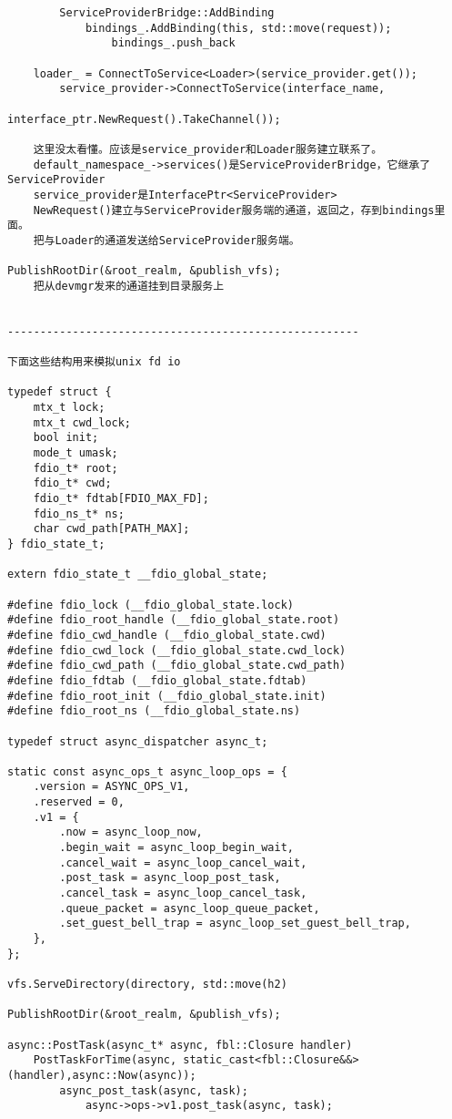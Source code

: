 \begin{verbatim}
        ServiceProviderBridge::AddBinding
            bindings_.AddBinding(this, std::move(request));
                bindings_.push_back

    loader_ = ConnectToService<Loader>(service_provider.get());
        service_provider->ConnectToService(interface_name,
                               interface_ptr.NewRequest().TakeChannel());

    这里没太看懂。应该是service_provider和Loader服务建立联系了。
    default_namespace_->services()是ServiceProviderBridge，它继承了ServiceProvider
    service_provider是InterfacePtr<ServiceProvider>
    NewRequest()建立与ServiceProvider服务端的通道，返回之，存到bindings里面。
    把与Loader的通道发送给ServiceProvider服务端。

PublishRootDir(&root_realm, &publish_vfs);
    把从devmgr发来的通道挂到目录服务上


------------------------------------------------------

下面这些结构用来模拟unix fd io

typedef struct {
    mtx_t lock;
    mtx_t cwd_lock;
    bool init;
    mode_t umask;
    fdio_t* root;
    fdio_t* cwd;
    fdio_t* fdtab[FDIO_MAX_FD];
    fdio_ns_t* ns;
    char cwd_path[PATH_MAX];
} fdio_state_t;

extern fdio_state_t __fdio_global_state;

#define fdio_lock (__fdio_global_state.lock)
#define fdio_root_handle (__fdio_global_state.root)
#define fdio_cwd_handle (__fdio_global_state.cwd)
#define fdio_cwd_lock (__fdio_global_state.cwd_lock)
#define fdio_cwd_path (__fdio_global_state.cwd_path)
#define fdio_fdtab (__fdio_global_state.fdtab)
#define fdio_root_init (__fdio_global_state.init)
#define fdio_root_ns (__fdio_global_state.ns)

typedef struct async_dispatcher async_t;

static const async_ops_t async_loop_ops = {
    .version = ASYNC_OPS_V1,
    .reserved = 0,
    .v1 = {
        .now = async_loop_now,
        .begin_wait = async_loop_begin_wait,
        .cancel_wait = async_loop_cancel_wait,
        .post_task = async_loop_post_task,
        .cancel_task = async_loop_cancel_task,
        .queue_packet = async_loop_queue_packet,
        .set_guest_bell_trap = async_loop_set_guest_bell_trap,
    },
};

vfs.ServeDirectory(directory, std::move(h2)

PublishRootDir(&root_realm, &publish_vfs);

async::PostTask(async_t* async, fbl::Closure handler)
    PostTaskForTime(async, static_cast<fbl::Closure&&>(handler),async::Now(async));
        async_post_task(async, task);
            async->ops->v1.post_task(async, task);


\end{verbatim}
